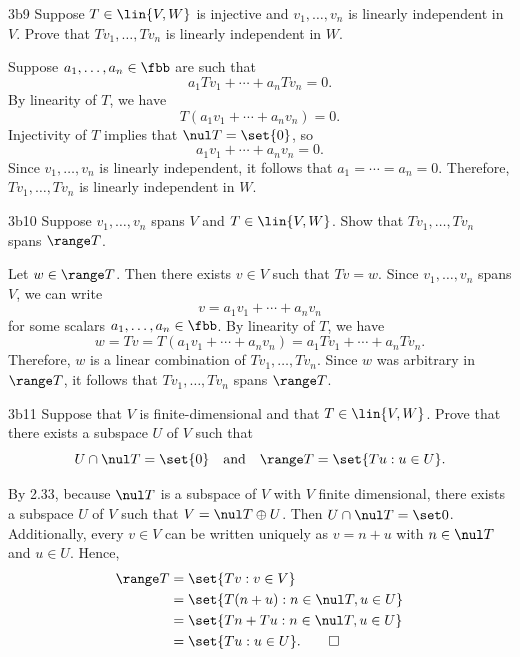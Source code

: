 \begin{exercise}{3b9}
    Suppose $T \in \lin{V, W}$ is injective and $v_1, \ldots, v_n$ is linearly independent in $V$.
	Prove that $Tv_1, \ldots, Tv_n$ is linearly independent in $W$.
\end{exercise}

\begin{sol}
    Suppose $a_1, \ldots, a_n \in \fbb$ are such that
    \[
    	a_1 Tv_1 + \cdots + a_n Tv_n = 0.
    \]
    By linearity of $T$, we have
    \[
    	T(a_1 v_1 + \cdots + a_n v_n) = 0.
    \]
    Injectivity of $T$ implies that $\nul T = \set{0}$, so
    \[
    	a_1 v_1 + \cdots + a_n v_n = 0.
    \]
    Since $v_1, \ldots, v_n$ is linearly independent, it follows that $a_1 = \cdots = a_n = 0$.
	Therefore, $Tv_1, \ldots, Tv_n$ is linearly independent in $W$.
\end{sol}

\begin{exercise}{3b10}
    Suppose $v_1, \ldots, v_n$ spans $V$ and $T \in \lin{V, W}$.
	Show that $Tv_1, \ldots, Tv_n$ spans $\range T$.
\end{exercise}

\begin{sol}
    Let $w \in \range T$.
	Then there exists $v \in V$ such that $Tv = w$.
	Since $v_1, \ldots, v_n$ spans $V$, we can write
    \[
    	v = a_1 v_1 + \cdots + a_n v_n
    \]
    for some scalars $a_1, \ldots, a_n \in \fbb$.
	By linearity of $T$, we have
    \[
    	w = Tv = T(a_1 v_1 + \cdots + a_n v_n) = a_1 Tv_1 + \cdots + a_n Tv_n.
    \]
    Therefore, $w$ is a linear combination of $Tv_1, \ldots, Tv_n$.
	Since $w$ was arbitrary in $\range T$, it follows that $Tv_1, \ldots, Tv_n$ spans $\range T$.
\end{sol}

\begin{exercise}{3b11}
    Suppose that $V$ is finite-dimensional and that $T \in \lin{V, W}$.
	Prove that there exists a subspace $U$ of $V$ such that
    \[
    	U \cap \nul T = \set{0} \quad \text{and} \quad \range T = \set{Tu : u \in U}.
    \]
\end{exercise}

\begin{sol}
    By 2.33, because $\nul T$ is a subspace of $V$ with $V$ finite dimensional, there exists a subspace $U$ of $V$ such that $V = \nul T \oplus U$.
    Then $U \cap \nul T = \set 0$.
    Additionally, every $v \in V$ can be written uniquely as $v = n + u$ with $n \in \nul T$ and $u \in U$.
    Hence,
    \begin{align*}
        \range T &= \set{Tv : v \in V} \\
        &= \set{T(n + u) : n \in \nul T, u \in U} \\
        &= \set{Tn + Tu : n \in \nul T, u \in U} \\
        &= \set{Tu : u \in U}. \qedhere
    \end{align*}
\end{sol}

